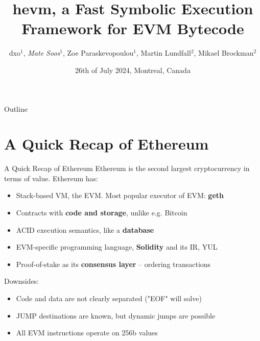 \documentclass[aspectratio=169]{beamer}
\title{hevm, a Fast Symbolic Execution Framework for EVM Bytecode}
\author{dxo$^{1}$, \emph{Mate Soos$^{1}$}, Zoe Paraskevopoulou$^{1}$, Martin Lundfall$^{2}$, Mikael Brockman$^{2}$}
\date{26th of July 2024, Montreal, Canada}
\begin{document}
\begin{frame}
    \titlepage 
\end{frame}

%

\begin{frame}{Outline}
    \tableofcontents
\end{frame}



\section{A Quick Recap of Ethereum}

\begin{frame}{A Quick Recap of Ethereum}
Ethereum is the second largest cryptocurrency in terms of value. Ethereum has:
\begin{itemize}
\item Stack-based VM, the EVM. Most popular executor of EVM: \textbf{geth}
\item Contracts with \textbf{code and storage}, unlike e.g. Bitcoin
\item ACID execution semantics, like a \textbf{database}
\item EVM-specific programming language, \textbf{Solidity} and its IR, YUL
\item Proof-of-stake as its \textbf{consensus layer} -- ordering transactions
\end{itemize}

Downsides:
\begin{itemize}
\item Code and data are not clearly separated ("EOF" will solve)
\item JUMP destinations are known, but dynamic jumps are possible
\item All EVM instructions operate on 256b values
\end{itemize}

\end{frame}
\end{document}
